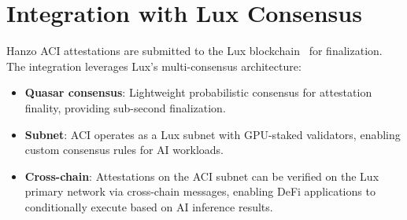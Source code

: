 \section{Integration with Lux Consensus}

\label{sec:lux}

Hanzo ACI attestations are submitted to the Lux blockchain~\cite{luxwhitepaper}
for finalization. The integration leverages Lux's multi-consensus architecture:

\begin{itemize}[leftmargin=1.1em]
    \item \textbf{Quasar consensus}: Lightweight probabilistic consensus for
    attestation finality, providing sub-second finalization.
    \item \textbf{Subnet}: ACI operates as a Lux subnet with GPU-staked
    validators, enabling custom consensus rules for AI workloads.
    \item \textbf{Cross-chain}: Attestations on the ACI subnet can be verified
    on the Lux primary network via cross-chain messages, enabling DeFi
    applications to conditionally execute based on AI inference results.
\end{itemize}

